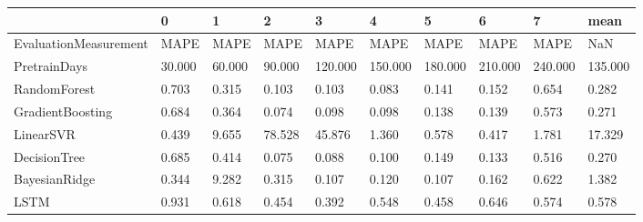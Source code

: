 \begin{tabular}{llllllllll}
\toprule
{} &      0 &      1 &      2 &       3 &       4 &       5 &       6 &       7 &    mean \\
\midrule
EvaluationMeasurement &   MAPE &   MAPE &   MAPE &    MAPE &    MAPE &    MAPE &    MAPE &    MAPE &     NaN \\
PretrainDays          & 30.000 & 60.000 & 90.000 & 120.000 & 150.000 & 180.000 & 210.000 & 240.000 & 135.000 \\
RandomForest          &  0.703 &  0.315 &  0.103 &   0.103 &   0.083 &   0.141 &   0.152 &   0.654 &   0.282 \\
GradientBoosting      &  0.684 &  0.364 &  0.074 &   0.098 &   0.098 &   0.138 &   0.139 &   0.573 &   0.271 \\
LinearSVR             &  0.439 &  9.655 & 78.528 &  45.876 &   1.360 &   0.578 &   0.417 &   1.781 &  17.329 \\
DecisionTree          &  0.685 &  0.414 &  0.075 &   0.088 &   0.100 &   0.149 &   0.133 &   0.516 &   0.270 \\
BayesianRidge         &  0.344 &  9.282 &  0.315 &   0.107 &   0.120 &   0.107 &   0.162 &   0.622 &   1.382 \\
LSTM                  &  0.931 &  0.618 &  0.454 &   0.392 &   0.548 &   0.458 &   0.646 &   0.574 &   0.578 \\
\bottomrule
\end{tabular}
